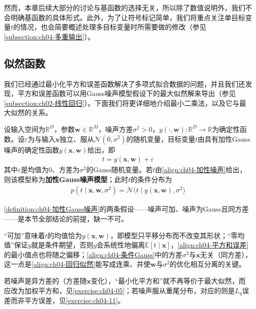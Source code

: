 \documentclass[../../main.tex]{subfiles}
\begin{document}
然而，本章后续大部分的讨论与基函数的选择无关，所以除了数值说明外，我们不会明确基函数的具体形式。此外，为了让符号标记简单，我们将重点关注单目标变量$t$的情况，也会简要概述处理多目标变量时所需要做的修改（参见\cref{subsection:ch04-多重输出}）。

\subsection{似然函数}\label{subsection:ch04-似然函数}

我们已经通过最小化平方和误差函数解决了多项式拟合数据的问题，并且我们还发现，平方和误差函数可以用Gauss噪声模型假设下的最大似然解来导出（参见\cref{subsection:ch02-线性回归}）。下面我们将更详细地介绍最小二乘法，以及它与最大似然的关系。

\begin{definition}[加性Gauss噪声模型]\label{definition:ch04-加性Gauss噪声}
设输入空间为$\mathbb{R}^{D}$，参数$\boldsymbol{w}\in\mathbb{R}^{M}$，噪声方差$\sigma^{2}>0$，$y(\cdot,\boldsymbol{w}):\mathbb{R}^{D}\to\mathbb{R}$为确定性函数。设$\varepsilon$为与输入$\boldsymbol{x}$独立、服从$\mathcal{N}(0,\sigma^{2})$的随机变量，目标变量$t$由具有加性Gauss噪声的确定性函数$y(\boldsymbol{x},\boldsymbol{w})$给出，即
\begin{align}
  t=y(\boldsymbol{x},\boldsymbol{w})+\varepsilon
  \label{align:ch04-加性噪声}
\end{align}
其中$\varepsilon$是均值为$0$、方差为$\sigma^{2}$的Gauss随机变量。若$t$由\eqref{align:ch04-加性噪声}给出，则该模型称为\textbf{加性Gauss噪声模型}；此时$t$的条件分布为
\begin{align}
  p(t\mid\boldsymbol{x},\boldsymbol{w},\sigma^2)=\mathcal{N}\bigl(t\mid y(\boldsymbol{x},\boldsymbol{w}),\sigma^2\bigr)
  \label{align:ch04-条件Gauss}
\end{align}
\end{definition}

\begin{remark}
\cref{definition:ch04-加性Gauss噪声}的两条假设——噪声可加、噪声为Gauss且同方差——是本节全部结论的前提，缺一不可。

“可加”意味着$t$的均值恰为$y(\boldsymbol{x},\boldsymbol{w})$，即模型只平移分布而不改变其形状；“零均值”保证$y$就是条件期望，否则$y$会系统性地偏离$\mathbb{E}[t\mid\boldsymbol{x}]$，\eqref{align:ch04-平方和误差}的最小值点也将随之偏移；\eqref{align:ch04-条件Gauss}中的方差$\sigma^2$与$\boldsymbol{x}$无关（同方差），这一点是\eqref{align:ch04-回归似然}能写成连乘、并使$\boldsymbol{w}$与$\sigma^2$的优化相互分离的关键。

若噪声是异方差的（方差随$\boldsymbol{x}$变化），“最小化平方和”就不再等价于最大似然，而应改为加权平方和，见\cref{exercise:ch04-05}；若噪声服从重尾分布，对应的则是$L_q$误差而非平方误差，见\cref{exercise:ch04-11}。
\end{remark}
\end{document}
